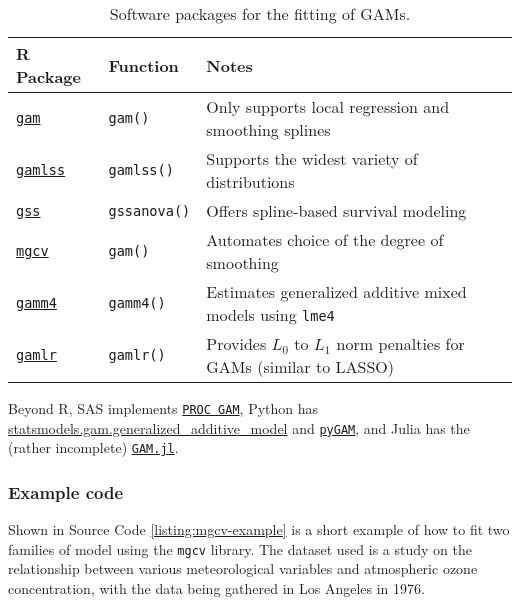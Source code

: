 \documentclass{report}
\begin{document}
\begin{table}[h!]
\centering
\begin{tabular}{||l l l||} 
 \hline
 \textbf{R Package} & \textbf{Function} & \textbf{Notes} \\ [0.5ex] 
  \hline\hline
  \href{https://cran.r-project.org/web/packages/gam/index.html}{\texttt{gam}} & \texttt{gam()} & Only supports local regression and smoothing splines \\ 
  \hline
  \href{https://cran.r-project.org/web/packages/gamlss/index.html}{\texttt{gamlss}} & \texttt{gamlss()} & Supports the widest variety of distributions \\
  \hline
  \href{https://cran.r-project.org/web/packages/gamlss/index.html}{\texttt{gss}} & \texttt{gssanova()} & Offers spline-based survival modeling \\
  \hline 
  \href{https://cran.r-project.org/web/packages/mgcv/index.html}{\texttt{mgcv}} & \texttt{gam()} & Automates choice of the degree of smoothing \\
  \hline 
  \href{https://cran.r-project.org/web/packages/gamm4/index.html}{\texttt{gamm4}} & \texttt{gamm4()} & Estimates generalized additive mixed models using \texttt{lme4} \\
  \hline 
  \href{https://cran.r-project.org/web/packages/gamlr/index.html}{\texttt{gamlr}} & \texttt{gamlr()} & Provides $L_0$ to $L_1$ norm penalties for GAMs (similar to LASSO) \\
  \hline
\end{tabular}
\caption{Software packages for the fitting of GAMs.}
\label{table:gam-software}
\end{table}

Beyond R, SAS implements \href{https://support.sas.com/documentation/cdl/en/statug/63033/HTML/default/viewer.htm#statug_gam_sect004.htm}{\texttt{PROC GAM}}, Python has \href{https://www.statsmodels.org/stable/gam.html}{statsmodels.gam.generalized\_additive\_model} and \href{https://pygam.readthedocs.io/en/latest/}{\texttt{pyGAM}}, and Julia has the (rather incomplete) \href{https://github.com/hendersontrent/GAM.jl?tab=readme-ov-file}{\texttt{GAM.jl}}.

\subsubsection{Example code}

Shown in Source Code \ref{listing:mgcv-example} is a short example of how to fit two families of model using the \texttt{mgcv} library. The dataset used is a study on the relationship between various meteorological variables and atmospheric ozone concentration, with the data being gathered in Los Angeles in 1976. 
\end{document}
